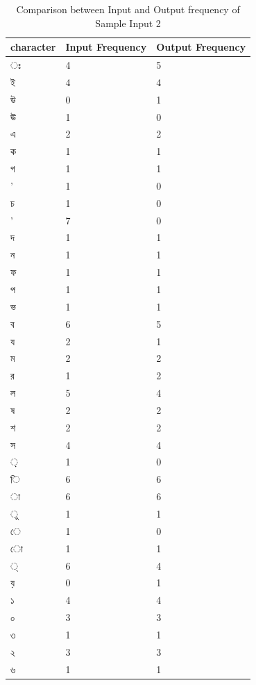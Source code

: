 \begin{table}[H]
\centering
\begin{tabular}{|p{2cm}|p{2cm}|p{2cm}|}
\hline
character & Input Frequency & Output Frequency \\
\hline
{\bengalifont ঃ} & 4 & 5\\
\hline
{\bengalifont ই} & 4 & 4\\
\hline
{\bengalifont উ} & 0 & 1\\
\hline
{\bengalifont ঊ} & 1 & 0\\
\hline
{\bengalifont এ} & 2 & 2\\
\hline
{\bengalifont ক} & 1 & 1\\
\hline
{\bengalifont গ} & 1 & 1\\
\hline
{\bengalifont ’} & 1 & 0\\
\hline
{\bengalifont চ} & 1 & 0\\
\hline
{\bengalifont '} & 7 & 0\\
\hline
{\bengalifont দ} & 1 & 1\\
\hline
{\bengalifont ন} & 1 & 1\\
\hline
{\bengalifont ফ} & 1 & 1\\
\hline
{\bengalifont প} & 1 & 1\\
\hline
{\bengalifont ভ} & 1 & 1\\
\hline
{\bengalifont ব} & 6 & 5\\
\hline
{\bengalifont য} & 2 & 1\\
\hline
{\bengalifont ম} & 2 & 2\\
\hline
{\bengalifont র} & 1 & 2\\
\hline
{\bengalifont ল} & 5 & 4\\
\hline
{\bengalifont ষ} & 2 & 2\\
\hline
{\bengalifont শ} & 2 & 2\\
\hline
{\bengalifont স} & 4 & 4\\
\hline
{\bengalifont ়} & 1 & 0\\
\hline
{\bengalifont ি} & 6 & 6\\
\hline
{\bengalifont া} & 6 & 6\\
\hline
{\bengalifont ু} & 1 & 1\\
\hline
{\bengalifont ে} & 1 & 0\\
\hline
{\bengalifont ো} & 1 & 1\\
\hline
{\bengalifont ্} & 6 & 4\\
\hline
{\bengalifont য়} & 0 & 1\\
\hline
{\bengalifont ১} & 4 & 4\\
\hline
{\bengalifont ০} & 3 & 3\\
\hline
{\bengalifont ৩} & 1 & 1\\
\hline
{\bengalifont ২} & 3 & 3\\
\hline
{\bengalifont ৬} & 1 & 1\\
\hline
\end{tabular}
\caption { Comparison between Input and Output frequency of Sample Input 2}
\label {tab:BTable2}
\end{table}


